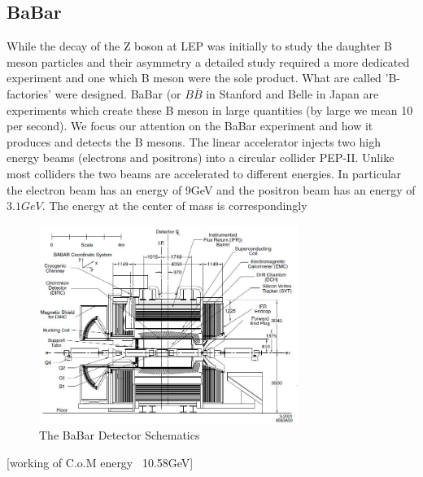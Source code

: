 \subsection{BaBar}
While the decay of the Z boson at LEP was initially to study the daughter B meson particles and their asymmetry a detailed study required a more dedicated experiment and one which B meson were the sole product. What are called 'B-factories' were designed. BaBar (or $B\overline{B}$ in Stanford and Belle in Japan are experiments which create these B meson in large quantities (by large we mean 10 per second). We  focus our attention on the BaBar experiment and how it produces and detects the B mesons. The linear accelerator injects two high energy beams (electrons and positrons) into a circular collider PEP-II. Unlike most colliders the two beams are accelerated to different energies. In particular the electron beam has an energy of 9GeV and the positron beam has an energy of $3.1GeV$. The energy at the center of mass is correspondingly 

\begin{figure}[h]
\centering
\includegraphics[width=0.75\textwidth]{figs/BBD.jpg}
\caption{The BaBar Detector Schematics}
\label{BBD}
\end{figure}



[working of C.o.M energy ~10.58GeV]

